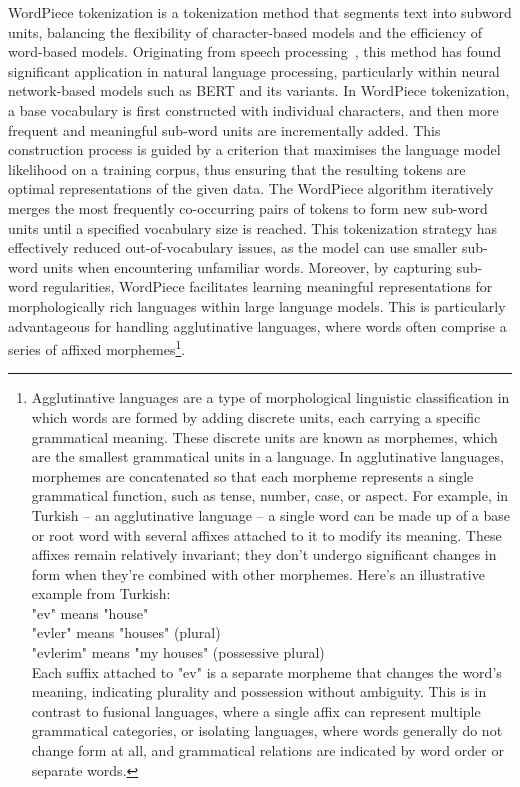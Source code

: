 WordPiece tokenization is a tokenization method that segments text into subword units, balancing the flexibility of character-based models and the efficiency of word-based models.
Originating from speech processing~\cite{wu2016google}, this method has found significant application in natural language processing, particularly within neural network-based models such as BERT and its variants.
In WordPiece tokenization, a base vocabulary is first constructed with individual characters, and then more frequent and meaningful sub-word units are incrementally added.
This construction process is guided by a criterion that maximises the language model likelihood on a training corpus, thus ensuring that the resulting tokens are optimal representations of the given data.
The WordPiece algorithm iteratively merges the most frequently co-occurring pairs of tokens to form new sub-word units until a specified vocabulary size is reached.
This tokenization strategy has effectively reduced out-of-vocabulary issues, as the model can use smaller sub-word units when encountering unfamiliar words.
Moreover, by capturing sub-word regularities, WordPiece facilitates learning meaningful representations for morphologically rich languages within large language models.
This is particularly advantageous for handling agglutinative languages, where words often comprise a series of affixed morphemes\footnote{
	Agglutinative languages are a type of morphological linguistic classification in which words are formed by adding discrete units, each carrying a specific grammatical meaning. These discrete units are known as morphemes, which are the smallest grammatical units in a language. In agglutinative languages, morphemes are concatenated so that each morpheme represents a single grammatical function, such as tense, number, case, or aspect.
	For example, in Turkish -- an agglutinative language -- a single word can be made up of a base or root word with several affixes attached to it to modify its meaning. These affixes remain relatively invariant; they don’t undergo significant changes in form when they’re combined with other morphemes. Here’s an illustrative example from Turkish:\\
	"ev" means "house"\\
	"evler" means "houses" (plural)\\
	"evlerim" means "my houses" (possessive plural)\\
	Each suffix attached to "ev" is a separate morpheme that changes the word's meaning, indicating plurality and possession without ambiguity.
	This is in contrast to fusional languages, where a single affix can represent multiple grammatical categories, or isolating languages, where words generally do not change form at all, and grammatical relations are indicated by word order or separate words.
}.

